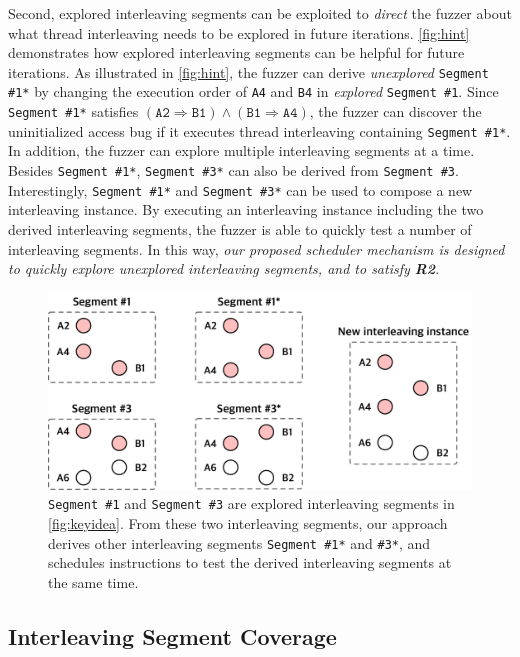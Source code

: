 Second, explored interleaving segments can be exploited to
\textit{direct} the fuzzer about what thread interleaving needs to be
explored in future iterations.
%
\autoref{fig:hint} demonstrates how explored interleaving segments
can be helpful for future iterations.
%
As illustrated in \autoref{fig:hint}, the fuzzer can derive
\textit{unexplored} \texttt{Segment \#1*} by changing the execution
order of \texttt{A4} and \texttt{B4} in \textit{explored}
\texttt{Segment \#1}.
%
Since \texttt{Segment \#1*} satisfies
$(\texttt{A2} \Rightarrow \texttt{B1}) \wedge (\texttt{B1} \Rightarrow
\texttt{A4})$, the fuzzer can discover the uninitialized access bug if
it executes thread interleaving containing \texttt{Segment \#1*}.
%
In addition, the fuzzer can explore multiple interleaving segments at
a time.
%
Besides \texttt{Segment \#1*}, \texttt{Segment \#3*} can also be
derived from \texttt{Segment \#3}.
%
Interestingly, \texttt{Segment \#1*} and \texttt{Segment \#3*} can be
used to compose a new interleaving instance.
%
By executing an interleaving instance
including the two derived interleaving segments, the fuzzer is able to
quickly test a number of interleaving segments.
%
In this way, \textit{our proposed scheduler mechanism is designed to
  quickly explore unexplored interleaving segments, and to satisfy
  \textbf{R2}}.
%
\begin{figure}[t]
  \centering
  \includegraphics[width=0.9\linewidth]{fig/hint.pdf}
  \caption{\texttt{Segment \#1} and \texttt{Segment \#3} are explored
    interleaving segments in \autoref{fig:keyidea}.
    From these two interleaving segments, our approach derives other
    interleaving segments \texttt{Segment \#1*} and \texttt{\#3*}, and
    schedules instructions to test the derived interleaving segments
    at the same time.}
  \label{fig:hint}
\end{figure}
%



\subsection{Interleaving Segment Coverage}
\label{ss:coverage}

